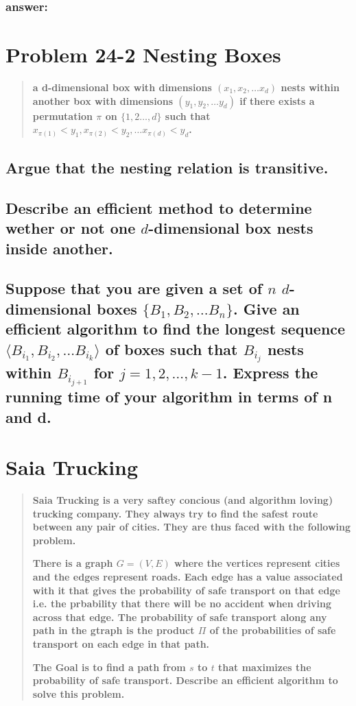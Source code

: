 \documentclass[titlepage]{article}\usepackage[]{graphicx}\usepackage[]{color}
\begin{document}
\subsubsection{answer:}


\section{Problem 24-2 Nesting Boxes}
\begin{quote}
  \textbf{a d-dimensional box with dimensions $(x_1, x_2, \dots x_d)$
	\textbf{nests} within another box with dimensions $(y_1, y_2, \dots y_d)$
	if there exists a permutation $\pi$ on $\{1,2\dots,d\}$ such that 
	$ x_{\pi(1)} < y_1, x_{\pi(2)} < y_2, \dots x_{\pi(d)} < y_d$.  }
\end{quote}

\subsection{Argue that the nesting relation is transitive.}


\subsection{Describe an efficient method to determine wether or not one
$d$-dimensional box nests inside another.}



\subsection{Suppose that you are given a set of $n$ $d$-dimensional boxes
  $\{B_1, B_2,\dots B_n\}$. Give an efficient algorithm to find the longest
  sequence $\langle B_{i_1}, B_{i_2},\dots B_{i_k}\rangle$ of boxes such that
  $B_{i_j}$ nests within  
  $B_{i_{j+1}}$ for $j = 1,2,\dots,k-1$. Express the running time of your
algorithm in terms of n and d.}

\section{Saia Trucking}
\begin{quote}
  \textbf{Saia Trucking is a very saftey concious (and algorithm loving)
  trucking company. They always try to find the safest route between any pair
of cities. They are thus faced with the following problem.}

\textbf{There is a graph $G = (V,E)$ where the vertices represent cities and the edges
represent roads. Each edge has a value associated with it that gives the
probability of safe transport on that edge i.e. the prbability that there will
be no accident when driving across that edge. The probability of safe transport
along any path in the gtraph is the product $\Pi$ of the probabilities of safe
transport on each edge in that path.}

\textbf{The Goal is to find a path from $s$ to $t$ that maximizes the probability of
safe transport. Describe an efficient algorithm to solve this problem.  }
\end{quote}
\end{document}
